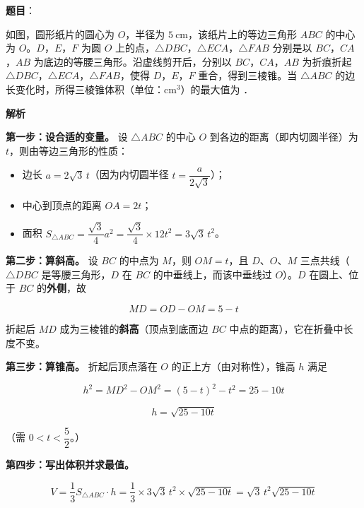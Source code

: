 \begin{answer}

\textbf{题目}：

如图，圆形纸片的圆心为 $O$，半径为 $5\ \mathrm{cm}$，该纸片上的等边三角形 $ABC$ 的中心为 $O$。$D$，$E$，$F$ 为圆 $O$ 上的点，$\triangle DBC$，$\triangle ECA$，$\triangle FAB$ 分别是以 $BC$，$CA$，$AB$ 为底边的等腰三角形。沿虚线剪开后，分别以 $BC$，$CA$，$AB$ 为折痕折起 $\triangle DBC$，$\triangle ECA$，$\triangle FAB$，使得 $D$，$E$，$F$ 重合，得到三棱锥。当 $\triangle ABC$ 的边长变化时，所得三棱锥体积（单位：$\mathrm{cm}^{3}$）的最大值为 \gkblank{}．
\nopagebreak[4]
\begin{center}\end{center}
\nopagebreak[4]
\textbf{解析}

\textbf{第一步：设合适的变量。} 设 $\triangle ABC$ 的中心 $O$ 到各边的距离（即内切圆半径）为 $t$，则由等边三角形的性质：

\begin{itemize}
\item 边长 $a=2\sqrt3\,t$（因为内切圆半径 $t=\dfrac a{2\sqrt3}$）；
\item 中心到顶点的距离 $OA=2t$；
\item 面积 $S_{\triangle ABC}=\dfrac{\sqrt3}4a^{2}=\dfrac{\sqrt3}4\times12t^{2}=3\sqrt3\,t^{2}$。
\end{itemize}

\textbf{第二步：算斜高。} 设 $BC$ 的中点为 $M$，则 $OM=t$，且 $D$、$O$、$M$ 三点共线（$\triangle DBC$ 是等腰三角形，$D$ 在 $BC$ 的中垂线上，而该中垂线过 $O$）。$D$ 在圆上、位于 $BC$ 的\textbf{外侧}，故

\nopagebreak[4]
\[MD=OD-OM=5-t\]

折起后 $MD$ 成为三棱锥的\textbf{斜高}（顶点到底面边 $BC$ 中点的距离），它在折叠中长度不变。

\textbf{第三步：算锥高。} 折起后顶点落在 $O$ 的正上方（由对称性），锥高 $h$ 满足

\nopagebreak[4]
\[h^{2}=MD^{2}-OM^{2}=(5-t)^{2}-t^{2}=25-10t\]

\nopagebreak[4]
\[h=\sqrt{25-10t}\]

（需 $0<t<\dfrac52$。）

\textbf{第四步：写出体积并求最值。}

\nopagebreak[4]
\[V=\frac13S_{\triangle ABC}\cdot h=\frac13\times3\sqrt3\,t^{2}\times\sqrt{25-10t}=\sqrt3\,t^{2}\sqrt{25-10t}\]


\end{answer}
